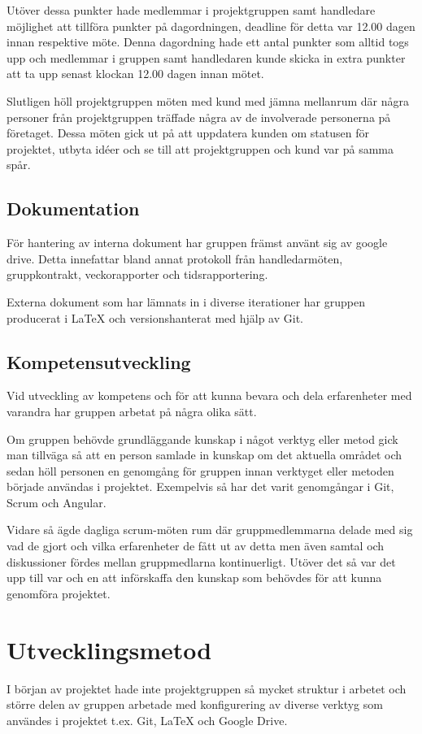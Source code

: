 Utöver dessa punkter hade medlemmar i projektgruppen samt handledare möjlighet att tillföra punkter på dagordningen, deadline för detta var 12.00 dagen innan respektive möte.
Denna dagordning hade ett antal punkter som alltid togs upp och medlemmar i gruppen samt handledaren kunde skicka in extra punkter att ta upp senast klockan 12.00 dagen innan mötet.

Slutligen höll projektgruppen möten med kund med jämna mellanrum där några personer från projektgruppen träffade några av de involverade personerna på företaget. Dessa möten gick ut på att uppdatera kunden om statusen för projektet, utbyta idéer och se till att projektgruppen och kund var på samma spår.

\subsection{Dokumentation}
För hantering av interna dokument har gruppen främst använt sig av google drive. Detta innefattar bland annat protokoll från handledarmöten, gruppkontrakt, veckorapporter och tidsrapportering.

Externa dokument som har lämnats in i diverse iterationer har gruppen producerat i LaTeX och versionshanterat med hjälp av Git.

\subsection{Kompetensutveckling}
Vid utveckling av kompetens och för att kunna bevara och dela erfarenheter med varandra har gruppen arbetat på några olika sätt.

Om gruppen behövde grundläggande kunskap i något verktyg eller metod gick man tillväga så att en person samlade in kunskap om det aktuella området och sedan höll personen en genomgång för gruppen innan verktyget eller metoden började användas i projektet. Exempelvis så har det varit genomgångar i Git, Scrum och Angular. 

Vidare så ägde dagliga scrum-möten rum där gruppmedlemmarna delade med sig vad de gjort och vilka erfarenheter de fått ut av detta men även samtal och diskussioner fördes mellan gruppmedlarna kontinuerligt. Utöver det så var det upp till var och en att införskaffa den kunskap som behövdes 
för att kunna genomföra projektet.  

\section{Utvecklingsmetod}
I början av projektet hade inte projektgruppen så mycket struktur i arbetet och större delen av gruppen arbetade med konfigurering av diverse verktyg som användes i projektet t.ex. Git, LaTeX och Google Drive.

